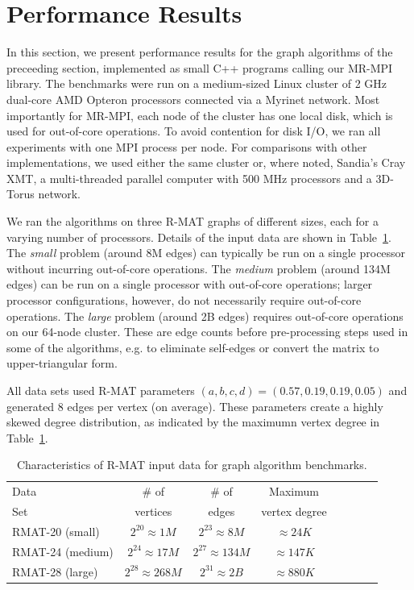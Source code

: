 \section{Performance Results}
\label{sec:results}

In this section, we present performance results for the graph
algorithms of the preceeding section, implemented as small C++
programs calling our MR-MPI library.  The benchmarks were run on a
medium-sized Linux cluster of 2 GHz dual-core AMD Opteron processors
connected via a Myrinet network.  Most importantly for MR-MPI, each
node of the cluster has one local disk, which is used for out-of-core
operations.  To avoid contention for disk I/O, we ran all experiments
with one MPI process per node.  For comparisons with other
implementations, we used either the same cluster or, where noted,
Sandia's Cray XMT, a multi-threaded parallel computer with 500 {MHz}
processors and a 3D-Torus network.

We ran the algorithms on three R-MAT graphs of different sizes, each
for a varying number of processors.  Details of the input data are
shown in Table~\ref{t:rmats}.  The {\it small} problem (around 8M
edges) can typically be run on a single processor without incurring
out-of-core operations.  The {\it medium} problem (around 134M edges)
can be run on a single processor with out-of-core operations; larger
processor configurations, however, do not necessarily require
out-of-core operations.  The {\it large} problem (around 2B edges)
requires out-of-core operations on our 64-node cluster.  These are
edge counts before pre-processing steps used in some of the
algorithms, e.g. to eliminate self-edges or convert the matrix to
upper-triangular form.


All data sets used R-MAT parameters $(a, b, c, d) = (0.57, 0.19, 0.19,
0.05)$ and generated 8 edges per vertex (on average).  These
parameters create a highly skewed degree distribution, as indicated by
the maximumn vertex degree in Table~\ref{t:rmats}.

\begin{table}
\begin{center}
\begin{tabular}{|l|c|c|c|c|c|c|c|}
\hline
Data & \# of    & \# of & Maximum \\
Set  & vertices & edges & vertex degree\\
\hline
RMAT-20 (small)   &$2^{20} \approx 1M$ & $2^{23} \approx 8M$ &  $\approx 24K$ \\
RMAT-24 (medium)  &$2^{24} \approx 17M$ & $2^{27} \approx 134M$ &  $\approx 147K$ \\
RMAT-28 (large)   &$2^{28} \approx 268M$ & $2^{31} \approx 2B$& $\approx 880K$ \\
\hline
\end{tabular}
\caption{Characteristics of R-MAT input data for graph algorithm
benchmarks.}
\label{t:rmats}
\end{center}
\end{table}


